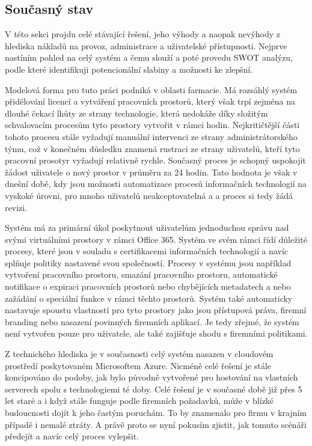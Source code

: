 \documentclass[12pt]{article}
\begin{document}
\begin{sloppypar}
\begin{spacing}{1.15}
        \section*{Současný stav}
        V této sekci projdu celé stávající řešení, jeho výhody a naopak nevýhody
        z hlediska nákladů na provoz, administrace a uživatelské přístupnosti.
        Nejprve nastíním pohled na celý systém a čemu slouží a poté provedu SWOT
        analýzu, podle které identifikuji potencionální slabiny a možnosti ke
        zlepšní.

        Modelová forma pro tuto práci podniká v oblasti farmacie. Má rozsáhlý
        systém přidělování licencí a vytváření pracovních prostorů, který však
        trpí zejména na dlouhé čekací lhůty ze strany technologie, která
        nedokáže díky složitým schvalovacím procesům tyto prostory vytvořit v
        rámci hodin. Nejkritičtější části tohoto procesu stále vyžadují manuální
        intervenci ze strany administrátorského týmu, což v konečném důsledku
        znamená rustraci ze strany uživatelů, kteří tyto pracovní prosotyr
        vyžadují relativně rychle. Současný proces je schopný uspokojit žádost
        uživatele o nový prostor v průměru za 24 hodin. Tato hodnota je však v
        dnešní době, kdy jsou možnosti automatizace procesů  informačních 
        technologií na vyskoké úrovni, pro mnoho uživatelů neakceptovatelná a
        a proces si tedy žádá revizi. 
        
        Systém má za primární úkol poskytnout uživatelům jednoduchou správu nad
        svými virtuálními prostory v rámci Office 365. Systém ve svém rámci řídí 
        důležité procesy, které jsou v souladu s certifikacemi informačních 
        technologií a navíc splňuje politiky nastavené svou společností. Procesy 
        v systému jsou například vytvoření pracovního prostoru, smazání pracovního 
        prostoru, automatické notifikace o expiraci pracovních prostorů nebo chybějících 
        metadatech a nebo zažádání o speciální funkce v rámci těchto prostorů. Systém také
        automaticky nastavuje spoustu vlastností pro tyto prostory jako jsou
        přístupová práva, firemní branding nebo nasazení povinných firemních
        aplikací. Je tedy zřejmé, že systém není vytvořen pouze pro uživatele,
        ale také zajišťuje shodu s firemními politikami.

        Z technického hlediska je v současnosti celý systém nasazen v cloudovém 
        prostředí poskytovaném Microsoftem Azure. Nicméně celé řešení je stále 
        koncipováno do podoby, jak bylo původně vytvořené pro hostování na 
        vlastních serverech spolu s technologiemi té doby. Celé řešení je v 
        současné době již přes 5 let staré a i když stále funguje podle firemních 
        požadavků, může v blízké budoucnosti dojít k jeho častým poruchám. To by
        znamenalo pro firmu v krajním případě i nemalé ztráty. A právě proto se 
        nyní pokusím zjistit, jak tomuto scénáři předejít a navíc celý proces
        vylepšit.


\end{spacing}
\end{sloppypar}
\end{document}
